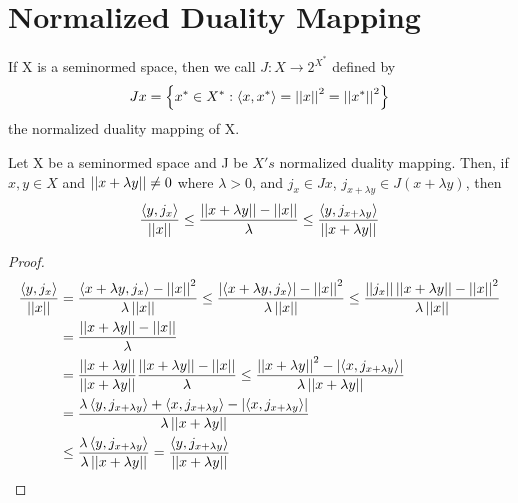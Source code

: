 
\section{Normalized Duality Mapping}
\begin{df} 
    If X is a seminormed space, then we call $J:X \to 2^{X^*}$ defined by 
    \begin{equation}
        Jx=\left\{x^* \in X^* : \ip{x,x^*}=\norm{x}^2=\norm{x^*}^2\right\}
    \end{equation} 
    the normalized duality mapping of X. 
\end{df} 
\begin{prop}
    \label{prop:normalizeddualityinequality}
    Let X be a seminormed space and J be $X's$ normalized duality mapping.
    Then, if $x,y \in X$ and $\norm{x+\lambda y} \neq 0$ where $\lambda > 0$, and $j_x \in Jx$, $j_{x+\lambda y} \in J(x+\lambda y)$, then 
    \begin{equation}
        \frac{\ip{y,j_x}}{\norm{x}} \leq \frac{\norm{x+\lambda y}-\norm{x}}{\lambda} \leq \frac{\ip{y,j_{x+\lambda y}}}{\norm{x+\lambda y}}
    \end{equation}
    \begin{proof}
        \begin{equation}
            \begin{split}
                \frac{\ip{y,j_x}}{\norm{x}} &= \frac{\ip{x+\lambda y,j_x}-\norm{x}^2}{\lambda \norm{x}} \leq \frac{\abs{\ip{x+\lambda y,j_x}}-\norm{x}^2}{\lambda \norm{x}} \leq \frac{\norm{j_x} \norm{x+\lambda y} - \norm{x}^2}{\lambda \norm{x}}\\
                &= \frac{\norm{x+\lambda y}-\norm{x}}{\lambda}\\
                & = \frac{\norm{x+\lambda y}}{\norm{x+\lambda y}} \frac{\norm{x+\lambda y} - \norm{x}}{\lambda} \leq \frac{\norm{x+\lambda y}^2 - \abs{\ip{x,j_{x+\lambda y}}}}{\lambda \norm{x+\lambda y}}\\
                & = \frac{\lambda \ip{y,j_{x+\lambda y}} +\ip{x,j_{x+\lambda y}} - \abs{\ip{x,j_{x+\lambda y}}}}{\lambda \norm{x+\lambda y}}\\
                & \leq \frac{\lambda \ip{y,j_{x+\lambda y}}}{\lambda \norm{x+\lambda y}} = \frac{\ip{y,j_{x+\lambda y}}}{\norm{x+\lambda y}}
            \end{split}
        \end{equation}
    \end{proof} 
\end{prop} 

